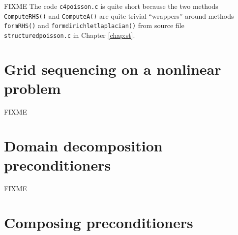 
FIXME The code \texttt{c4poisson.c} is quite short because the two methods \texttt{ComputeRHS()} and \texttt{ComputeA()} are quite trivial ``wrappers'' around methods \texttt{formRHS()} and \texttt{formdirichletlaplacian()} from source file \texttt{structuredpoisson.c} in Chapter \ref{chap:st}.  %



\section{Grid sequencing on a nonlinear problem}

FIXME

\section{Domain decomposition preconditioners}

FIXME

%
%

\section{Composing preconditioners}

